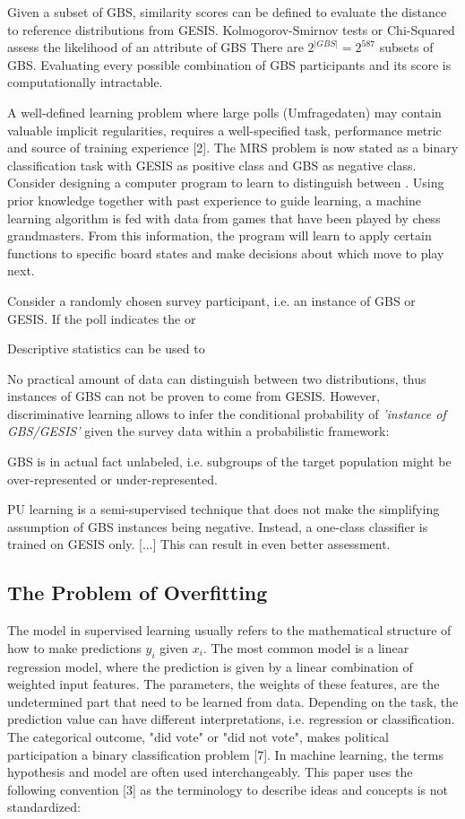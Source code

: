 Given a subset of GBS, similarity scores can be defined to evaluate the distance to reference distributions from GESIS. Kolmogorov-Smirnov tests or Chi-Squared assess the likelihood of an attribute of GBS  There are \(2^{|GBS|} = 2^{587}\) subsets of GBS. Evaluating every possible combination of GBS participants and its score is computationally intractable.

A well-deﬁned learning problem where large polls (Umfragedaten) may contain valuable implicit regularities, requires a well-speciﬁed task, performance metric and source of training experience [2]. The MRS problem is now stated as a binary classification task with GESIS as positive class and GBS as negative class. Consider designing a computer program to learn to distinguish between . Using prior knowledge together with past experience to guide learning, a machine learning algorithm
is fed with data from games that have been played by chess grandmasters. From this information, the program will learn to apply certain functions to speciﬁc board states and make decisions about which move to play next.

Consider a randomly chosen survey participant, i.e. an instance of GBS or GESIS. If the poll indicates the or

Descriptive statistics can be used to 
 
No practical amount of data can distinguish between two distributions, thus instances of GBS can not be proven to come from GESIS. However, discriminative learning allows to infer the conditional probability of \textit{'instance of GBS/GESIS'} given the survey data within a probabilistic framework:


GBS is in actual fact unlabeled, i.e. subgroups of the target population might be over-represented or under-represented.  

PU learning is a semi-supervised technique that does not make the simplifying assumption of GBS instances being negative. Instead, a one-class classifier is trained on GESIS only. [...] This can result in even better assessment.

\subsection{The Problem of Overfitting}

The model in supervised learning usually refers to the mathematical structure of how to make predictions \(y_i\) given \(x_i\). The most common model is a linear regression model, where the prediction is given by a linear combination of weighted input features. The parameters, the weights of these features, are the undetermined part that need to be learned from data. Depending on the task, the prediction value can have different interpretations, i.e. regression or classiﬁcation. The categorical outcome, "did vote" or "did not vote", makes political participation a binary classiﬁcation problem [7]. In machine learning, the terms hypothesis and model are often used interchangeably. This paper uses the following convention [3] as the terminology to describe ideas and concepts is not standardized:


